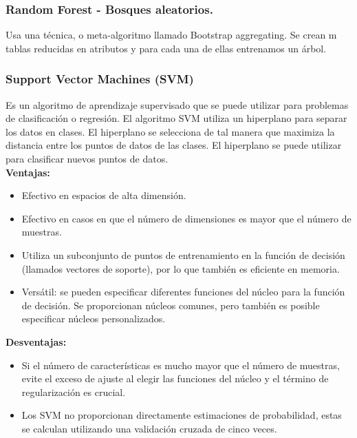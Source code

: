\documentclass[../main.tex]{subfiles}
\begin{document}
        \subsubsection{Random Forest - Bosques aleatorios.}
            Usa una técnica, o meta-algoritmo llamado Bootstrap aggregating. Se crean m tablas reducidas en atributos y para cada una de ellas entrenamos un árbol.
        
        \subsubsection{Support Vector Machines (SVM)}
            Es un algoritmo de aprendizaje supervisado que se puede utilizar para problemas de clasificación o regresión. El algoritmo SVM utiliza un hiperplano para separar los datos en clases. El hiperplano se selecciona de tal manera que maximiza la distancia entre los puntos de datos de las clases. El hiperplano se puede utilizar para clasificar nuevos puntos de datos.\\
            
            \textbf{Ventajas:}
            \begin{itemize}
                \item Efectivo en espacios de alta dimensión.
                \item Efectivo en casos en que el número de dimensiones es mayor que el número de muestras.
                \item Utiliza un subconjunto de puntos de entrenamiento en la función de decisión (llamados vectores de soporte), por lo que también es eficiente en memoria.
                \item Versátil: se pueden especificar diferentes funciones del núcleo para la función de decisión. Se proporcionan núcleos comunes, pero también es posible especificar núcleos personalizados.
            \end{itemize}
            
            \textbf{Desventajas:}
            \begin{itemize}
                \item Si el número de características es mucho mayor que el número de muestras, evite el exceso de ajuste al elegir las funciones del núcleo y el término de regularización es crucial.
                \item Los SVM no proporcionan directamente estimaciones de probabilidad, estas se calculan utilizando una validación cruzada de cinco veces.
            \end{itemize}
            
\end{document}
